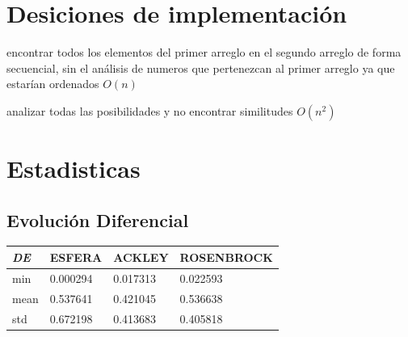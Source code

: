 \documentclass{article}
\begin{document}
\newpage
\section{Desiciones de implementación}
\begin{warn}
  encontrar todos los elementos del primer arreglo en el segundo arreglo de forma secuencial, sin el análisis de numeros que pertenezcan al primer arreglo ya que estarían ordenados $O(n)$
\end{warn}
\begin{warn}
  analizar todas las posibilidades y no encontrar similitudes $O(n^{2})$
\end{warn}

\newpage
\section{Estadisticas}
\subsection{Evolución Diferencial}
\begin{table}[H]
  \centering
  \begin{tabular}{|l|l|l|l|}
    \hline
        {\textit{\textbf{DE}}} & ESFERA   & ACKLEY   & ROSENBROCK \\ \hline
        min                        & 0.000294 & 0.017313 & 0.022593   \\ \hline
        mean                       & 0.537641 & 0.421045 & 0.536638   \\ \hline
        std                        & 0.672198 & 0.413683 & 0.405818   \\ \hline
  \end{tabular}
\end{table}
\end{document}
